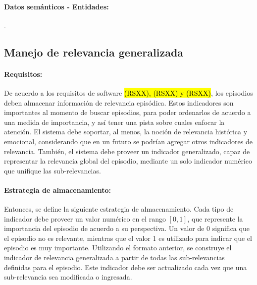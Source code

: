 

\paragraph{Datos semánticos - Entidades:}
.





\subsection{Manejo de relevancia generalizada}

\paragraph{Requisitos:}
De acuerdo a los requisitos de software \hl{(RSXX), (RSXX) y (RSXX)}, los episodios deben almacenar información de relevancia episódica. Estos indicadores son importantes al momento de buscar episodios, para poder ordenarlos de acuerdo a una medida de importancia, y así tener una pista sobre cuales enfocar la atención. El sistema debe soportar, al menos, la noción de relevancia histórica y emocional, considerando que en un futuro se podrían agregar otros indicadores de relevancia. También, el sistema debe proveer un indicador generalizado, capaz de representar la relevancia global del episodio, mediante un solo indicador numérico que unifique las sub-relevancias.


\paragraph{Estrategia de almacenamiento:}
Entonces, se define la siguiente estrategia de almacenamiento. Cada tipo de indicador debe proveer un valor numérico en el rango $[0, 1]$, que represente la importancia del episodio de acuerdo a su perspectiva. Un valor de 0 significa que el episodio no es relevante, mientras que el valor 1 es utilizado para indicar que el episodio es muy importante. Utilizando el formato anterior, se construye el indicador de relevancia generalizada a partir de todas las sub-relevancias definidas para el episodio. Este indicador debe ser actualizado cada vez que una sub-relevancia sea modificada o ingresada.


